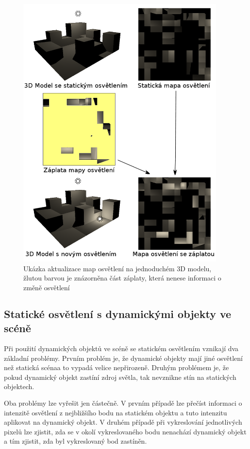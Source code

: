 \documentclass[11pt,twoside,a4paper]{book}
\begin{document}
\begin{center}
\begin{figure}[h!]
\includegraphics[width=105mm]{figures/lmupdate.png}
\caption{Ukázka aktualizace map osvětlení na jednoduchém 3D modelu, žlutou barvou je znázorněna část záplaty, která nenese informaci o změně osvětlení}
\end{figure}
\end{center}

\subsection{Statické osvětlení s dynamickými objekty ve scéně}
Při použití dynamických objektů ve scéně se statickém osvětlením vznikají dva základní problémy. Prvním problém je, že dynamické objekty mají jiné osvětlení než statická scéna\linebreak a to vypadá velice nepřirozeně. Druhým problémem je, že pokud dynamický objekt zastíní zdroj světla, tak nevznikne stín na statických objektech.

Oba problémy lze vyřešit jen částečně. V prvním případě lze přečíst informaci o intenzitě osvětlení z nejbližšího bodu na statickém objektu a tuto intenzitu aplikovat na dynamický objekt. V druhém případě při vykreslování jednotlivých pixelů lze zjistit, zda se v okolí vykreslovaného bodu nenachází dynamický objekt a tím zjistit, zda byl vykreslovaný bod zastíněn.
\newpage
\end{document}
